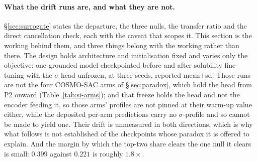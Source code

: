 \paragraph{What the drift runs are, and what they are not.}
\S\ref{sec:surrogate} states the departure, the three nulls, the transfer ratio and the direct
cancellation check, each with the caveat that scopes it. This section is the working behind them,
and three things belong with the working rather than there. The design holds architecture and
initialisation fixed and varies only the objective: one grounded model checkpointed before and
after solubility fine-tuning with the $\sigma$ head unfrozen, at three seeds, reported
mean$\pm$sd. Those runs are not the four COSMO-SAC arms of \S\ref{sec:paradox}, which hold the head
from P2 onward (Table~\ref{tab:si-arms}); and that freeze holds the head and not the encoder feeding
it, so those arms' profiles are not pinned at their warm-up value either, while the deposited
per-arm predictions carry no $\sigma$-profile and so cannot be made to yield one. Their drift is
unmeasured in both directions, which is why what follows is not established of the checkpoints whose
paradox it is offered to explain. And the margin by which the top-two share clears the one null it
clears is small: $0.399$ against $0.221$ is roughly $1.8\times$.


